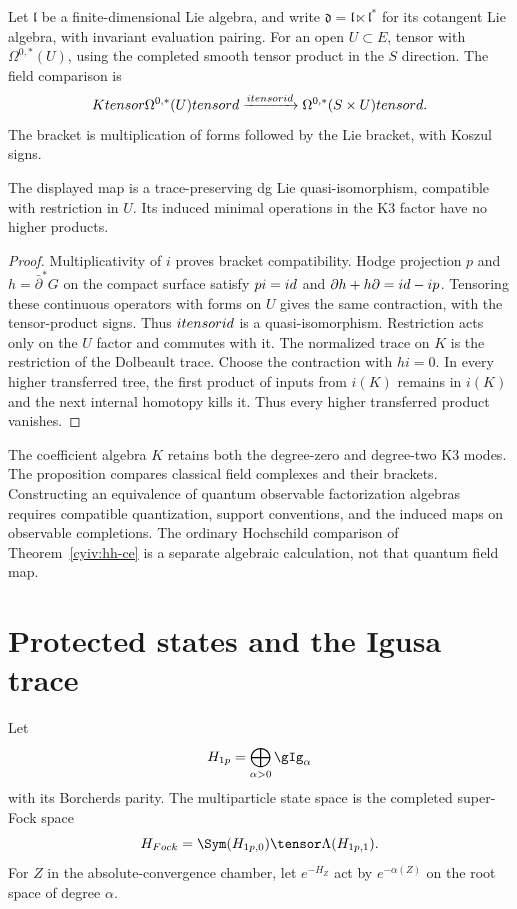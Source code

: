 Let $\mathfrak l$ be a finite-dimensional Lie algebra, and write
$\mathfrak d=\mathfrak l\ltimes\mathfrak l^*$ for its cotangent Lie
algebra, with invariant evaluation pairing.
For an open $U\subset E$, tensor with $\Omega^{0,*}(U)$, using the
completed smooth tensor product in the $S$ direction.
The field comparison is
\[
 Ktensor\Omega^{0,*}(U)tensord
 \xrightarrow{itensorid}
 \Omega^{0,*}(S\times U)tensord.
\]
The bracket is multiplication of forms followed by the Lie bracket,
with Koszul signs.

\begin{proposition}\label{cyiv:k3-classical-reduction}
The displayed map is a trace-preserving dg Lie quasi-isomorphism,
compatible with restriction in $U$.
Its induced minimal operations in the K3 factor have no higher products.
\end{proposition}
\begin{proof}
Multiplicativity of $i$ proves bracket compatibility.
Hodge projection $p$ and $h=\bar\partial^*G$ on the compact surface satisfy
$pi=id$ and $\partial h+h\partial=id-ip$.
Tensoring these continuous operators with forms on $U$ gives the same
contraction, with the tensor-product signs.
Thus $itensorid$ is a quasi-isomorphism.
Restriction acts only on the $U$ factor and commutes with it.
The normalized trace on $K$ is the restriction of the Dolbeault trace.
Choose the contraction with $hi=0$.
In every higher transferred tree, the first product of inputs from
$i(K)$ remains in $i(K)$ and the next internal homotopy kills it.
Thus every higher transferred product vanishes.
\end{proof}

The coefficient algebra $K$ retains both the degree-zero and degree-two
K3 modes.
The proposition compares classical field complexes and their brackets.
Constructing an equivalence of quantum observable factorization algebras
requires compatible quantization, support conventions, and the induced
maps on observable completions.
The ordinary Hochschild comparison of Theorem~\ref{cyiv:hh-ce} is a
separate algebraic calculation, not that quantum field map.

\chapter{Protected states and the Igusa trace}
Let
\[
 \mathcal H_{\mathrm{1p}}
 =\widehat\bigoplus_{\alpha>0}\gIg_\alpha
\]
with its Borcherds parity.  The multiparticle state space is the completed super-Fock space
\[
 \mathcal H_{\mathrm{Fock}}=\widehat\Sym(\mathcal H_{\mathrm{1p},\bar0})
 \tensor\widehat\Lambda(\mathcal H_{\mathrm{1p},\bar1}).
\]
For $Z$ in the absolute-convergence chamber, let $e^{-H_Z}$ act by $e^{-\alpha(Z)}$ on the root space of degree $\alpha$.

